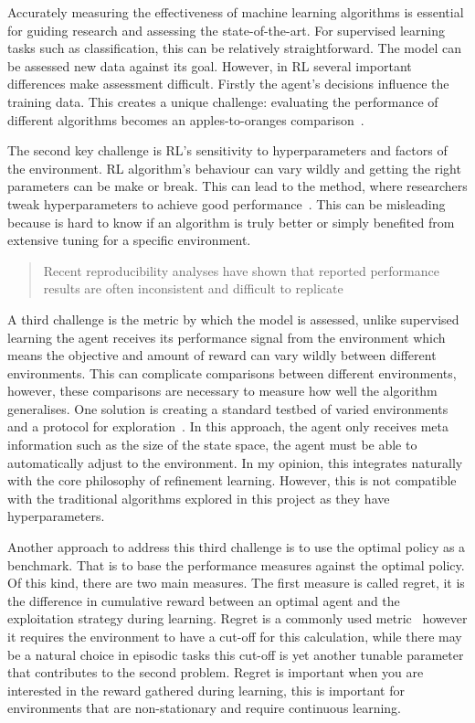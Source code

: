 \documentclass[]{final_report}
\begin{document}
Accurately measuring the effectiveness of machine learning algorithms is essential for guiding research and assessing the state-of-the-art. For supervised learning tasks such as classification, this can be relatively straightforward. The model can be assessed new data against its goal. However, in RL several important differences make assessment difficult. Firstly the agent's decisions influence the training data.  This creates a unique challenge: evaluating the performance of different algorithms becomes an apples-to-oranges comparison~\cite{sutton2018reinforcement}.

The second key challenge is RL's sensitivity to hyperparameters and factors of the environment. RL algorithm's behaviour can vary wildly and getting the right parameters can be make or break. This can lead to the  method, where researchers tweak hyperparameters to achieve good performance~\cite{evaluatingRL}. This can be misleading because is hard to know if an algorithm is truly better or simply benefited from extensive tuning for a specific environment. 

\begin{quote}
  Recent reproducibility analyses have shown that reported performance results are often inconsistent and difficult to replicate~\cite{evaluatingRL}
\end{quote}

\newpage
A third challenge is the metric by which the model is assessed, unlike supervised learning the agent receives its performance signal from the environment which means the objective and amount of reward can vary wildly between different environments. This can complicate comparisons between different environments, however, these comparisons are necessary to measure how well the algorithm generalises. One solution is creating a standard testbed of varied environments and a protocol for exploration~\cite{assessingDeepRL, evaluatingRL}. In this approach, the agent only receives meta information such as the size of the state space, the agent must be able to automatically adjust to the environment. In my opinion, this integrates naturally with the core philosophy of refinement learning. However, this is not compatible with the traditional algorithms explored in this project as they have hyperparameters.

Another approach to address this third challenge is to use the optimal policy as a benchmark. That is to base the performance measures against the optimal policy. Of this kind, there are two main measures. The first measure is called regret, it is the difference in cumulative reward between an optimal agent and the exploitation strategy during learning. Regret is a commonly used metric~\cite{modelFree} however it requires the environment to have a cut-off for this calculation, while there may be a natural choice in episodic tasks this cut-off is yet another tunable parameter that contributes to the second problem. Regret is important when you are interested in the reward gathered during learning, this is important for environments that are non-stationary and require continuous learning.
\end{document}
